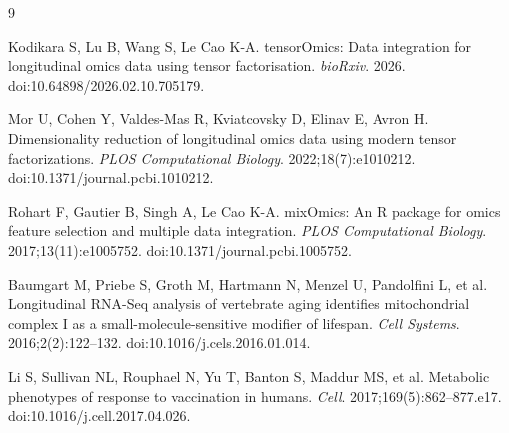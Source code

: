 \documentclass[11pt,a4paper]{article}
\begin{document}
\begin{thebibliography}{9}

Kodikara S, Lu B, Wang S, Le Cao K-A.
\newblock tensorOmics: Data integration for longitudinal omics data using tensor factorisation.
\newblock \textit{bioRxiv}. 2026. doi:10.64898/2026.02.10.705179.

Mor U, Cohen Y, Valdes-Mas R, Kviatcovsky D, Elinav E, Avron H.
\newblock Dimensionality reduction of longitudinal omics data using modern tensor factorizations.
\newblock \textit{PLOS Computational Biology}. 2022;18(7):e1010212. doi:10.1371/journal.pcbi.1010212.

Rohart F, Gautier B, Singh A, Le Cao K-A.
\newblock mixOmics: An R package for omics feature selection and multiple data integration.
\newblock \textit{PLOS Computational Biology}. 2017;13(11):e1005752. doi:10.1371/journal.pcbi.1005752.

Baumgart M, Priebe S, Groth M, Hartmann N, Menzel U, Pandolfini L, et al.
\newblock Longitudinal RNA-Seq analysis of vertebrate aging identifies mitochondrial complex I as a small-molecule-sensitive modifier of lifespan.
\newblock \textit{Cell Systems}. 2016;2(2):122--132. doi:10.1016/j.cels.2016.01.014.

Li S, Sullivan NL, Rouphael N, Yu T, Banton S, Maddur MS, et al.
\newblock Metabolic phenotypes of response to vaccination in humans.
\newblock \textit{Cell}. 2017;169(5):862--877.e17. doi:10.1016/j.cell.2017.04.026.

\end{thebibliography}
\end{document}
